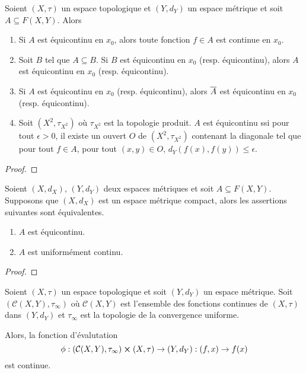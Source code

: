 \begin{proposition}
	Soient $(X, \tau)$ un espace topologique et $(Y, d_{Y})$ un espace métrique
	et soit $A \subseteq F(X, Y)$. Alors

	\begin{enumerate}
		\item Si $A$ est équicontinu en $x_{0}$, alors toute fonction $f \in A$
			est continue en $x_{0}$.
		\item Soit $B$ tel que $A \subseteq B$. Si $B$ est équicontinu en
			$x_{0}$ (resp. équicontinu), alors $A$ est équicontinu en $x_{0}$
			(resp. équicontinu).
		\item Si $A$ est équicontinu en $x_{0}$ (resp. équicontinu), alors
			$\overline{A}$ est équicontinu en $x_{0}$ (resp. équicontinu).
		\item Soit $(X^{2}, \tau_{X^{2}})$ où $\tau_{X^{2}}$ est la topologie
			produit. $A$ est équicontinu ssi pour tout $\epsilon > 0$, il existe un
			ouvert $O$ de $(X^{2}, \tau_{X^{2}})$ contenant la diagonale tel que
			pour tout $f \in A$, pour tout $(x, y) \in O$, $d_{Y}(f(x), f(y))
			\leq \epsilon$.
	\end{enumerate}
\end{proposition}

\ifdefined\outputproof
\begin{proof}

\end{proof}
\fi

\begin{proposition}
	Soient $(X, d_{X})$, $(Y, d_{Y})$ deux espaces métriques
	et soit $A \subseteq F(X, Y)$. Supposons que $(X, d_{X})$ est un espace
	métrique compact, alors les assertions suivantes sont équivalentes.

	\begin{enumerate}
		\item $A$ est équicontinu.
		\item $A$ est uniformément continu.
	\end{enumerate}
\end{proposition}

\ifdefined\outputproof
\begin{proof}

\end{proof}
\fi

\begin{proposition}
	Soient $(X, \tau)$ un espace topologique et soit $(Y, d_{Y})$ un espace métrique.
	Soit $(\mathcal{C}(X, Y), \tau_{\infty})$ où $\mathcal{C}(X, Y)$ est
	l'ensemble des fonctions continues de $(X, \tau)$ dans $(Y, d_{Y})$ et
	$\tau_{\infty}$ est la topologie de la convergence uniforme.

	Alors, la fonction d'évalutation
	\begin{equation}
		\phi : (\mathcal{C}(X, Y), \tau_{\infty}) \cross (X, \tau)
		\rightarrow (Y, d_{Y}) : (f, x) \rightarrow f(x)
	\end{equation}
	est continue.
\end{proposition}

